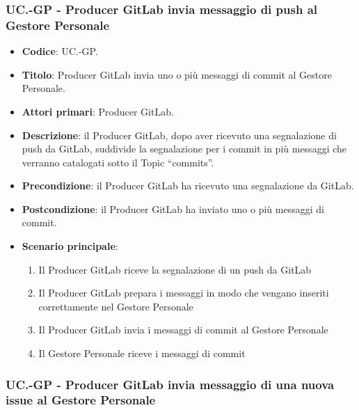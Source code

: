 
	\subsubsection{UC\theuccount.\thesubuccount-GP - Producer GitLab invia messaggio di push al Gestore Personale}

		\begin{itemize}
			\item \textbf{Codice}: UC\theuccount.\thesubuccount-GP.
			\item \textbf{Titolo}: Producer GitLab invia uno o più messaggi di commit al Gestore Personale.
			\item \textbf{Attori primari}: Producer GitLab.
			\item \textbf{Descrizione}: il Producer GitLab, dopo aver ricevuto una segnalazione di push da  \newline GitLab, suddivide la segnalazione per i commit in più messaggi che verranno catalogati sotto il Topic ``commits''.
			\item \textbf{Precondizione}: il Producer GitLab ha ricevuto una segnalazione da GitLab.
			\item \textbf{Postcondizione}: il Producer GitLab ha inviato uno o più messaggi di commit.
			\item \textbf{Scenario principale}:
			\begin{enumerate}
				\item Il Producer GitLab riceve la segnalazione di un push da GitLab
				\item Il Producer GitLab prepara i messaggi in modo che vengano inseriti correttamente nel Gestore Personale
				\item Il Producer GitLab invia i messaggi di
				commit al Gestore Personale
                \item Il Gestore Personale riceve i messaggi di commit
			\end{enumerate}
		\end{itemize}


	\subsubsection{UC\theuccount.\thesubuccount-GP - Producer GitLab invia messaggio di una nuova issue al Gestore Personale}

